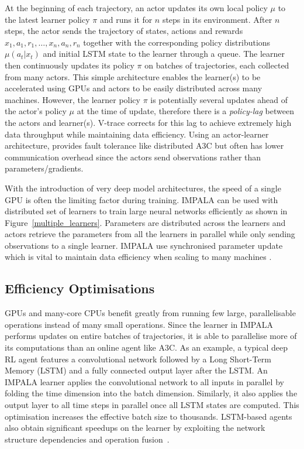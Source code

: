 At the beginning of each trajectory, an actor updates its own local policy $\mu$ to the latest learner policy $\pi$ and runs it for $n$ steps in its environment. After $n$ steps, the actor sends the trajectory of states, actions and rewards  $x_1, a_1, r_1, \dots, x_n, a_n, r_n$ together with the corresponding policy distributions $\mu(a_t|x_t)$ and initial LSTM state to the learner through a queue. The learner then continuously updates its policy $\pi$ on batches of trajectories, each collected from many actors. This simple architecture enables the learner(s) to be accelerated using GPUs and actors to be easily distributed across many machines. However, the learner policy $\pi$ is potentially several updates ahead of the actor's policy $\mu$ at the time of update, therefore there is a \textit{policy-lag} between the actors and learner(s). V-trace corrects for this lag to achieve extremely high data throughput while maintaining data efficiency. Using an actor-learner architecture, provides fault tolerance like distributed A3C but often has lower communication overhead since the actors send observations rather than parameters/gradients.








With the introduction of very deep model architectures, the speed of a single GPU is often the limiting factor during training.
IMPALA can be used with distributed set of learners to train large neural networks efficiently as shown in Figure~\ref{multiple_learners}.
Parameters are distributed across the learners and actors retrieve the parameters from all the learners in parallel while only sending observations to a single learner.
IMPALA use synchronised parameter update which is vital to maintain data efficiency when scaling to many machines \cite{DBLP:journals/corr/ChenMBJ16}.



\subsection{Efficiency Optimisations}
\label{sec:efficiency_optimizations}

GPUs and many-core CPUs benefit greatly from running few large, parallelisable operations instead of many small operations.
Since the learner in IMPALA performs updates on entire batches of trajectories, it is able to parallelise more of its computations than an online agent like A3C.
As an example, a typical deep RL agent features a convolutional network followed by a Long Short-Term Memory (LSTM) \cite{LSTM} and a fully connected output layer after the LSTM. An IMPALA learner applies the convolutional network to all inputs in parallel by folding the time dimension into the batch dimension.
Similarly, it also applies the output layer to all time steps in parallel once all LSTM states are computed.
This optimisation increases the effective batch size to thousands.
LSTM-based agents also obtain significant speedups on the learner by exploiting the network structure dependencies and operation fusion~\cite{DBLP:journals/corr/AppleyardKB16}.

